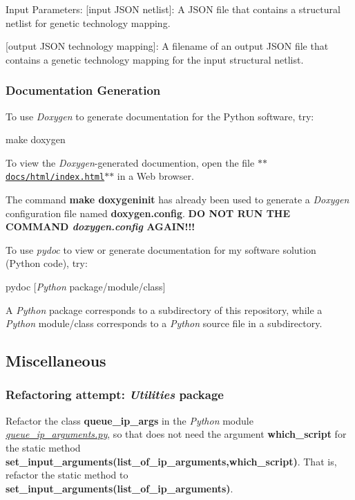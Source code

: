 Input Parameters\+: \mbox{[}input J\+S\+O\+N netlist\mbox{]}\+: A J\+S\+O\+N file that contains a structural netlist for genetic technology mapping.

\mbox{[}output J\+S\+O\+N technology mapping\mbox{]}\+: A filename of an output J\+S\+O\+N file that contains a genetic technology mapping for the input structural netlist.

\subsubsection*{Documentation Generation}

To use {\itshape Doxygen} to generate documentation for the Python software, try\+: \begin{DoxyVerb}make doxygen
\end{DoxyVerb}


To view the {\itshape Doxygen}-\/generated documention, open the file \href{https://github.com/BDAthlon/2018-wannabe-postdoc-1/blob/master/docs/html/index.html}{\tt $\ast$$\ast$docs/html/index.html$\ast$$\ast$} in a Web browser.

The command {\bfseries make doxygeninit} has already been used to generate a {\itshape Doxygen} configuration file named {\bfseries doxygen.\+config}. {\bfseries D\+O N\+O\+T R\+U\+N T\+H\+E C\+O\+M\+M\+A\+N\+D {\itshape doxygen.\+config} A\+G\+A\+I\+N!!!}

To use {\itshape pydoc} to view or generate documentation for my software solution (Python code), try\+:

pydoc \mbox{[}{\itshape Python} package/module/class\mbox{]}

A {\itshape Python} package corresponds to a subdirectory of this repository, while a {\itshape Python} module/class corresponds to a {\itshape Python} source file in a subdirectory.

\subsection*{Miscellaneous}

\subsubsection*{Refactoring attempt\+: {\itshape Utilities} package}

Refactor the class {\bfseries queue\+\_\+ip\+\_\+args} in the {\itshape Python} module {\itshape \hyperlink{queue__ip__arguments_8py}{queue\+\_\+ip\+\_\+arguments.\+py}}, so that does not need the argument {\bfseries which\+\_\+script} for the static method {\bfseries set\+\_\+input\+\_\+arguments(list\+\_\+of\+\_\+ip\+\_\+arguments,which\+\_\+script)}. That is, refactor the static method to {\bfseries set\+\_\+input\+\_\+arguments(list\+\_\+of\+\_\+ip\+\_\+arguments)}.

